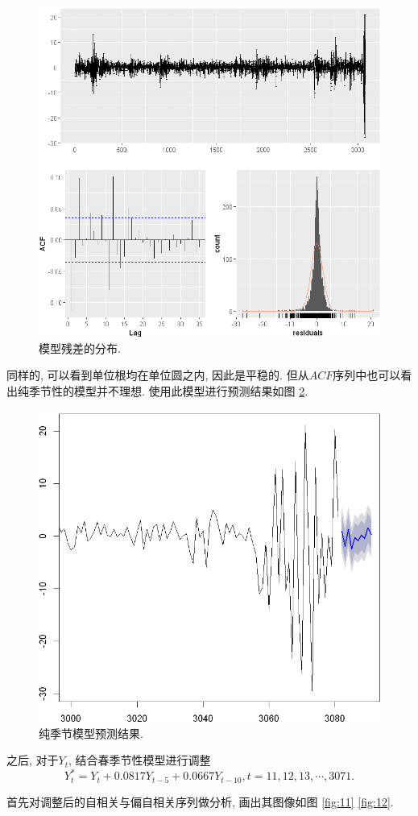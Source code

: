 \documentclass[11pt]{article}
\begin{document}
\begin{center}
\begin{minipage}{0.45\textwidth}
\begin{figure}
            \hspace{-25pt}\includegraphics[width=.9\textwidth]{output_25_1}
            \caption{模型残差的分布.\label{fig:9}}
        \end{figure}
    \end{minipage}
\end{center}
    
\qquad 同样的, 可以看到单位根均在单位圆之内, 因此是平稳的. 但从$ACF$序列中也可以看出纯季节性的模型并不理想. 使用此模型进行预测结果如图 \ref{fig:10}.
\begin{figure}
    \centering
    \includegraphics[width=.4\textwidth]{output_27_0}
    \caption{纯季节模型预测结果.\label{fig:10}}
\end{figure}

\qquad 之后, 对于$Y_t$, 结合春季节性模型进行调整
\[
    Y_t^*=Y_t+0.0817Y_{t-5}+0.0667Y_{t-10}, t=11,12,13,\cdots,3071.
\]

首先对调整后的自相关与偏自相关序列做分析, 画出其图像如图 \ref{fig:11} \ref{fig:12}. 
\end{document}
